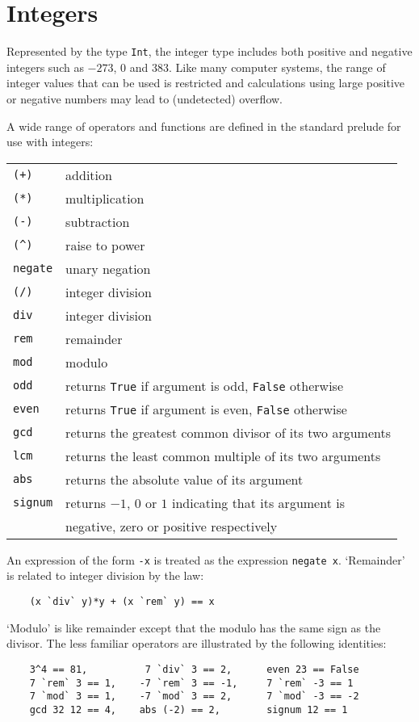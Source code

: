 \section{Integers}
Represented by the type \verb"Int", the integer type includes both  positive
and negative integers such as $-273$, $0$  and  $383$.   Like  many  computer
systems, the range of integer values that can be used is restricted and
calculations using large positive  or  negative  numbers  may  lead  to
(undetected) overflow.

A wide range of operators and functions are  defined  in  the  standard
prelude for use with integers:
\BQ
\begin{tabular}{ll}
    \verb"(+)"&     addition\\
    \verb"(*)"&     multiplication\\
    \verb"(-)"&     subtraction\\
    \verb"(^)"&     raise to power\\
    \verb"negate"&  unary negation\\
    \verb"(/)"&     integer division\\
    \verb"div"&     integer division\\
    \verb"rem"&     remainder\\
    \verb"mod"&     modulo\\
    \verb"odd"&     returns \verb"True" if argument is odd, 
                    \verb"False" otherwise\\
    \verb"even"&    returns \verb"True" if argument is even,
                    \verb"False" otherwise\\
    \verb"gcd"&     returns the greatest common divisor of its two arguments\\
    \verb"lcm"&     returns the least common multiple of its two arguments\\
    \verb"abs"&     returns the absolute value of its argument\\
    \verb"signum"&  returns $-1$, $0$ or $1$ indicating that its argument 
                    is \\
                 &  negative, zero or positive respectively
\end{tabular}
\EQ
An expression of the form \verb"-x" is treated
as the expression \verb"negate x".
`Remainder' is related to integer division by the law:
\begin{verbatim}
    (x `div` y)*y + (x `rem` y) == x
\end{verbatim}
`Modulo' is like remainder except that the modulo has the same
sign as the divisor.
The  less  familiar  operators  are  illustrated   by   the   following
identities:
\begin{verbatim}
    3^4 == 81,          7 `div` 3 == 2,      even 23 == False
    7 `rem` 3 == 1,    -7 `rem` 3 == -1,     7 `rem` -3 == 1
    7 `mod` 3 == 1,    -7 `mod` 3 == 2,      7 `mod` -3 == -2
    gcd 32 12 == 4,    abs (-2) == 2,        signum 12 == 1
\end{verbatim}


